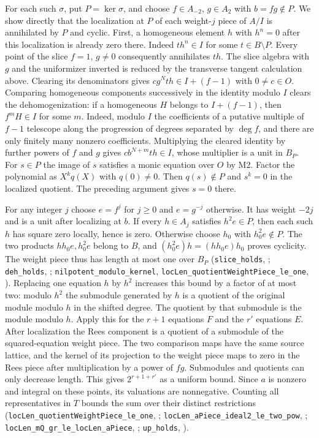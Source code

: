 For each such $\sigma$, put $P=\ker\sigma$, and choose
$f\in A_{-2}$, $g\in A_2$ with $b=fg\notin P$. We show directly
that the localization at $P$ of each weight-$j$ piece of $A/I$ is
annihilated by $P$ and cyclic. First, a homogeneous element $h$ with
$h^n=0$ after this localization is already zero there. Indeed
$t h^n\in I$ for some $t\in B\setminus P$. Every point of the slice
$f=1$, $g\ne0$ consequently annihilates $th$. The slice algebra with
$g$ and the uniformizer inverted is reduced by the transverse tangent
calculation above. Clearing its denominators gives
$c g^N th\in I+(f-1)$ with $0\ne c\in O$. Comparing homogeneous
components successively in the identity modulo $I$ clears the
dehomogenization: if a homogeneous $H$ belongs to $I+(f-1)$,
then $f^mH\in I$ for some $m$. Indeed, modulo $I$ the coefficients
of a putative multiple of $f-1$ telescope along the progression
of degrees separated by $\deg f$, and there are only finitely many
nonzero coefficients. Multiplying the cleared identity by further
powers of $f$ and $g$ gives $cb^{N+m}th\in I$, whose multiplier
is a unit in $B_P$. For $s\in P$ the image of $s$ satisfies a monic
equation over $O$ by M2. Factor the polynomial as $X^k q(X)$ with
$q(0)\ne0$. Then $q(s)\notin P$ and $s^k=0$ in the localized
quotient. The preceding argument gives $s=0$ there.

For any integer $j$ choose $e=f^j$ for $j\ge0$ and $e=g^{-j}$
otherwise. It has weight $-2j$ and is a unit after localizing at
$b$. If every $h\in A_j$ satisfies $h^2e\in P$, then each such $h$
has square zero locally, hence is zero. Otherwise choose $h_0$ with
$h_0^2e\notin P$. The two products $hh_0e,h_0^2e$ belong to $B$,
and $(h_0^2e)h=(hh_0e)h_0$ proves cyclicity. The weight piece thus
has length at most one over $B_P$
(\nolinkurl{slice_holds}, ;
\nolinkurl{deh_holds}, ;
\nolinkurl{nilpotent_modulo_kernel},
\nolinkurl{locLen_quotientWeightPiece_le_one},
).
Replacing one
equation $h$ by $h^2$ increases this bound by a factor of at most
two: modulo $h^2$ the submodule generated by $h$ is a quotient of
the original module modulo $h$ in the shifted degree. The quotient
by that submodule is the module modulo $h$. Apply this for the
$r+1$ equations $F$ and the $r'$ equations $E$. After localization the Rees component is a quotient of a
submodule of the squared-equation weight piece. The two comparison
maps have the same source lattice, and the kernel of its projection
to the weight piece maps to zero in the Rees piece after multiplication
by a power of $fg$. Submodules and quotients can only decrease length. This gives $2^{r+1+r'}$ as a uniform bound.
Since $a$ is nonzero and integral on these points, its valuations
are nonnegative. Counting all representatives in $T$ bounds the
sum over their distinct restrictions
(\nolinkurl{locLen_quotientWeightPiece_le_one},
;
\nolinkurl{locLen_aPiece_ideal2_le_two_pow},
;
\nolinkurl{locLen_mQ_gr_le_locLen_aPiece},
;
\nolinkurl{up_holds}, ).

